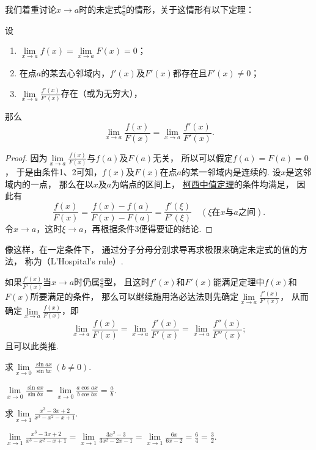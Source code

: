 我们着重讨论\(x \to a\)时的未定式\(\frac{0}{0}\)的情形，关于这情形有以下定理：
\begin{theorem}\label{theorem:微分中值定理.洛必达法则1}
设\begin{enumerate}
	\item \(\lim\limits_{x\to a} f(x) = \lim\limits_{x\to a} F(x) = 0\)；
	\item 在点\(a\)的某去心邻域内，\(f'(x)\)及\(F'(x)\)都存在且\(F'(x) \neq 0\)；
	\item \(\lim\limits_{x \to a} \frac{f'(x)}{F'(x)}\)存在（或为无穷大），
\end{enumerate}
那么\[
	\lim\limits_{x \to a} \frac{f(x)}{F(x)}
	= \lim\limits_{x \to a} \frac{f'(x)}{F'(x)}.
\]
\begin{proof}
因为\(\lim\limits_{x\to a} \frac{f(x)}{F(x)}\)与\(f(a)\)及\(F(a)\)无关，
所以可以假定\(f(a)=F(a)=0\)，
于是由条件1、2可知，\(f(x)\)及\(F(x)\)在点\(a\)的某一邻域内是连续的.
设\(x\)是这邻域内的一点，
那么在以\(x\)及\(a\)为端点的区间上，
\hyperref[theorem:微分中值定理.柯西中值定理]{柯西中值定理}的条件均满足，
因此有\[
	\frac{f(x)}{F(x)}
	= \frac{f(x)-f(a)}{F(x)-F(a)}
	= \frac{f'(\xi)}{F'(\xi)}
	\quad(\text{\(\xi\)在\(x\)与\(a\)之间}).
\]
令\(x \to a\)，这时\(\xi \to a\)，再根据条件3便得要证的结论.
\end{proof}
\end{theorem}
像这样，在一定条件下，
通过分子分母分别求导再求极限来确定未定式的值的方法，
称为（L'Hospital's rule）.

如果\(\frac{f'(x)}{F'(x)}\)当\(x \to a\)时仍属\(\frac{0}{0}\)型，
且这时\(f'(x)\)和\(F'(x)\)能满足定理中\(f(x)\)和\(F(x)\)所要满足的条件，
那么可以继续施用洛必达法则先确定\(\lim\limits_{x \to a} \frac{f'(x)}{F'(x)}\)，
从而确定\(\lim\limits_{x \to a} \frac{f(x)}{F(x)}\)，即\[
	\lim\limits_{x \to a} \frac{f(x)}{F(x)}
	= \lim\limits_{x \to a} \frac{f'(x)}{F'(x)}
	= \lim\limits_{x \to a} \frac{f''(x)}{F''(x)};
\]
且可以此类推.

\begin{example}
\def\l{\lim\limits_{x\to0}}
\def\a{\l\frac{\sin ax}{\sin bx}}
求\(\a\ (b \neq 0)\).
\begin{solution}
\(\a = \l\frac{a \cos ax}{b \cos bx} = \frac{a}{b}\).
\end{solution}
\end{example}

\begin{example}
\def\l{\lim\limits_{x\to1}}
\def\a{\l\frac{x^3-3x+2}{x^3-x^2-x+1}}
求\(\a\).
\begin{solution}
\(\a = \l\frac{3x^2-3}{3x^2-2x-1} = \l\frac{6x}{6x-2} = \frac{6}{4} = \frac{3}{2}\).
\end{solution}
\end{example}

